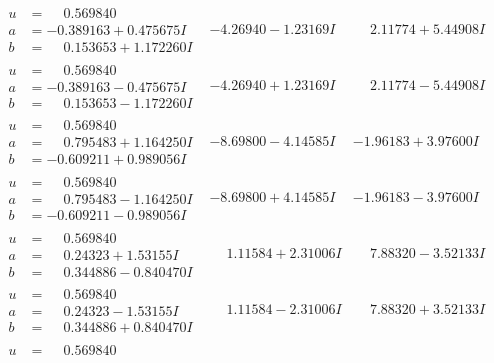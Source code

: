 \documentclass[1p]{elsarticle_modified}
\theoremstyle{definition}
\begin{document}
$$\begin{array}{c|c|c}
 \hline 
\begin{aligned}
u &= \phantom{-}0.569840\phantom{ +0.000000I} \\
a &= -0.389163 + 0.475675 I \\
b &= \phantom{-}0.153653 + 1.172260 I\end{aligned}
 & -4.26940 - 1.23169 I & \phantom{-}2.11774 + 5.44908 I \\ \hline\begin{aligned}
u &= \phantom{-}0.569840\phantom{ +0.000000I} \\
a &= -0.389163 - 0.475675 I \\
b &= \phantom{-}0.153653 - 1.172260 I\end{aligned}
 & -4.26940 + 1.23169 I & \phantom{-}2.11774 - 5.44908 I \\ \hline\begin{aligned}
u &= \phantom{-}0.569840\phantom{ +0.000000I} \\
a &= \phantom{-}0.795483 + 1.164250 I \\
b &= -0.609211 + 0.989056 I\end{aligned}
 & -8.69800 - 4.14585 I & -1.96183 + 3.97600 I \\ \hline\begin{aligned}
u &= \phantom{-}0.569840\phantom{ +0.000000I} \\
a &= \phantom{-}0.795483 - 1.164250 I \\
b &= -0.609211 - 0.989056 I\end{aligned}
 & -8.69800 + 4.14585 I & -1.96183 - 3.97600 I \\ \hline\begin{aligned}
u &= \phantom{-}0.569840\phantom{ +0.000000I} \\
a &= \phantom{-}0.24323 + 1.53155 I \\
b &= \phantom{-}0.344886 - 0.840470 I\end{aligned}
 & \phantom{-}1.11584 + 2.31006 I & \phantom{-}7.88320 - 3.52133 I \\ \hline\begin{aligned}
u &= \phantom{-}0.569840\phantom{ +0.000000I} \\
a &= \phantom{-}0.24323 - 1.53155 I \\
b &= \phantom{-}0.344886 + 0.840470 I\end{aligned}
 & \phantom{-}1.11584 - 2.31006 I & \phantom{-}7.88320 + 3.52133 I \\ \hline\begin{aligned}
u &= \phantom{-}0.569840\phantom{ +0.000000I} \\

\end{aligned}
\end{array}$$
\end{document}

